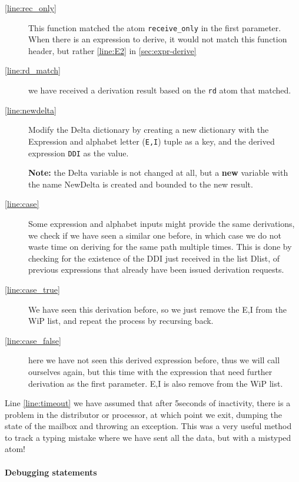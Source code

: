 \begin{description}
\item[\autoref{line:rec_only}] This function matched the atom \texttt{receive\_only} in the first parameter. When there is an expression to derive, it would not match this function header, but rather \autoref{line:E2} in \autoref{sec:expr-derive}
\item[\autoref{line:rd_match}] we have received a derivation result based
  on the \texttt{rd} atom that matched.
\item[\autoref{line:newdelta}] Modify the Delta dictionary by creating a
  new  dictionary with the Expression and alphabet letter
  (\texttt{{E,I}}) tuple as a key, and the derived expression
  \texttt{DDI} as the value.

 \textbf{Note:} the Delta variable is not
  changed at all, but a \textbf{new} variable with the name NewDelta
  is created and bounded to the new result.
\item[\autoref{line:case}] Some expression and alphabet inputs might
  provide the same derivations, we check if we have seen a similar one
  before, in which case we do not waste time on deriving for the same
  path multiple times. This is done by checking for the existence of
  the DDI just received in the list Dlist, of previous expressions that
  already have been issued derivation requests.
\item[\autoref{line:case_true}] We have seen this derivation before, so we
  just remove the {E,I} from the WiP list, and repeat the process by
  recursing back.
\item[\autoref{line:case_false}] here we have not seen this derived
  expression before, thus we will call ourselves again, but this time
  with the expression that need further derivation as the first
  parameter. {E,I} is also remove from the WiP list.
\end{description}

Line \autoref{line:timeout} we have assumed that after 5seconds of
inactivity, there is a problem in the distributor or processor, at
which point we exit, dumping the state of the mailbox and throwing an
exception. This was a very useful method to track a typing mistake
where we have sent all the data, but with a mistyped atom!


\paragraph{Debugging statements}

